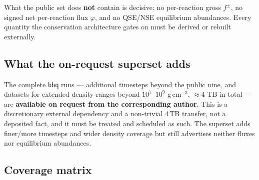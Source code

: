 \documentclass[11pt]{article}
\newcommand{\bbq}{\texttt{bbq}}
\begin{document}
What the public set does \textbf{not} contain is decisive: no per-reaction gross $f^{\pm}$, no signed net per-reaction flux $\varphi$, and no QSE/NSE equilibrium abundances. Every quantity the conservation architecture gates on must be derived or rebuilt externally.

\subsection{What the on-request superset adds}

The complete \bbq{} runs --- additional timesteps beyond the public nine, and datasets for extended density ranges beyond $10^7$--$10^9$ g\,cm$^{-3}$, $\approx$4 TB in total --- are \textbf{available on request from the corresponding author}. This is a discretionary external dependency and a non-trivial 4\,TB transfer, not a deposited fact, and it must be treated and scheduled as such. The superset adds finer/more timesteps and wider density coverage but still advertises neither fluxes nor equilibrium abundances.

\subsection{Coverage matrix}
\end{document}
